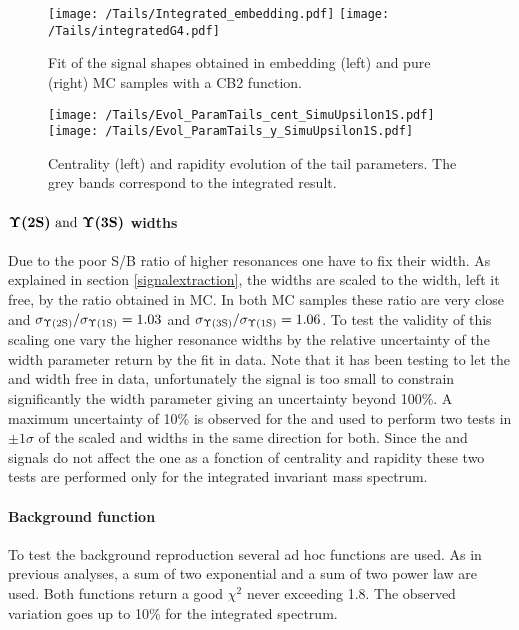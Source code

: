 \begin{figure}[!b]
\begin{center}
\texttt{[image: /Tails/Integrated\_embedding.pdf]}
\texttt{[image: /Tails/integratedG4.pdf]}\\
\end{center}
\caption{\label{tails}Fit of the signal shapes obtained in embedding (left) and pure (right) \ups MC samples with a CB2 function.}
\end{figure}

\begin{figure}[!t]
\begin{center}
\texttt{[image: /Tails/Evol\_ParamTails\_cent\_SimuUpsilon1S.pdf]}
\texttt{[image: /Tails/Evol\_ParamTails\_y\_SimuUpsilon1S.pdf]}
\end{center}
\caption{\label{evoltails}Centrality (left) and rapidity evolution of the tail parameters. The grey bands correspond to the integrated result.}
\end{figure}

\paragraph{$\boldsymbol{\Upsilon\mathrm{(2S)} \text{ and } \Upsilon\mathrm{(3S)}}$ widths}
Due to the poor S/B ratio of higher resonances one have to fix their width.
As explained in section \ref{signalextraction}, the widths are scaled to the \ups width, left it free, by the ratio obtained in MC.
In both MC samples these ratio are very close and $\sigma_{\Upsilon\mathrm{(2S)}}/\sigma_{\Upsilon\mathrm{(1S)}}=1.03$ and $\sigma_{\Upsilon\mathrm{(3S)}}/\sigma_{\Upsilon\mathrm{(1S)}}=1.06$.
To test the validity of this scaling one vary the higher resonance widths by the relative uncertainty of the \ups width parameter return by the fit in data.
Note that it has been testing to let the \upsp and \upspp width free in data, unfortunately the signal is too small to constrain significantly the width parameter giving an uncertainty beyond 100\%.
A maximum uncertainty of 10\% is observed for the \ups and used to perform two tests in $\pm1\sigma$ of the scaled \upsp and \upspp widths in the same direction for both.
Since the \upsp and \upspp signals do not affect the \ups one as a fonction of centrality and rapidity these two tests are performed only for the integrated invariant mass spectrum.

\paragraph{Background function} 
To test the background reproduction several ad hoc functions are used.
As in previous \upsi analyses, a sum of two exponential and a sum of two power law are used.
Both functions return a good $\chi^2$ never exceeding 1.8.
The observed variation goes up to 10\% for the integrated spectrum.    

